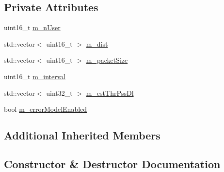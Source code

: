 \subsection*{Private Attributes}
\begin{DoxyCompactItemize}
\item 
uint16\+\_\+t \hyperlink{classns3_1_1LenaDeactivateBearerTestCase_a119f58840a145a5be90eef6e01784ee6}{m\+\_\+n\+User}
\item 
std\+::vector$<$ uint16\+\_\+t $>$ \hyperlink{classns3_1_1LenaDeactivateBearerTestCase_aa65554d27a1987eff686328a3441e8d0}{m\+\_\+dist}
\item 
std\+::vector$<$ uint16\+\_\+t $>$ \hyperlink{classns3_1_1LenaDeactivateBearerTestCase_a0d6c5b51de98a92178ecaa55b4bfc9df}{m\+\_\+packet\+Size}
\item 
uint16\+\_\+t \hyperlink{classns3_1_1LenaDeactivateBearerTestCase_a9e0c220c5ffe150a033cff11146c620a}{m\+\_\+interval}
\item 
std\+::vector$<$ uint32\+\_\+t $>$ \hyperlink{classns3_1_1LenaDeactivateBearerTestCase_afdb8a203e9b78c7d4b6262958d85d6f6}{m\+\_\+est\+Thr\+Pss\+Dl}
\item 
bool \hyperlink{classns3_1_1LenaDeactivateBearerTestCase_a3ec449d8bd99571df63d3fd1360d77a1}{m\+\_\+error\+Model\+Enabled}
\end{DoxyCompactItemize}
\subsection*{Additional Inherited Members}


\subsection{Constructor \& Destructor Documentation}
